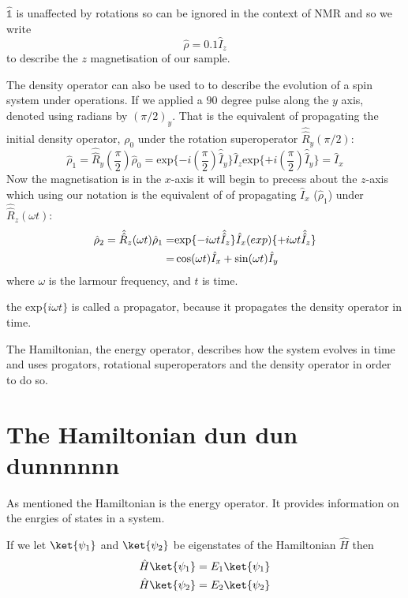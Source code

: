 $\hat{\mathbb{1}}$ is unaffected by rotations so can be ignored in the context of NMR
and so we write
\begin{equation}
  \hat{\rho} = 0.1\hat{I}_z
\end{equation}
to describe the $z$ magnetisation of our sample.

The density operator can also be used to to describe the evolution of a spin system under operations. If we applied a $90$ degree pulse along the $y$ axis, denoted using radians by $(\pi/2)_y$. That is the equivalent of propagating the initial density operator, $\rho_0$
under the rotation superoperator $\hat{\hat{R}}_y(\pi/2)$:
\begin{equation}
  \hat{\rho}_1 = \hat{\hat{R}}_y(\frac{\pi}{2})\hat\rho_0 = \text{exp}\{-i(\frac{\pi}{2})\hat{\hat{I}}_y\}\hat{I}_z\text{exp}\{+i(\frac{\pi}{2})\hat{\hat{I}}_y\} = \hat{I}_x
\end{equation}
Now the magnetisation is in the $x$-axis it will begin to precess about the $z$-axis which using our notation is the equivalent of of propagating $\hat{I}_x$ ($\hat{\rho}_1$)
under $\hat{\hat{R}}_z(\omega t)$:
\begin{equation}\label{eqn:propagate}
\begin{align}
  \hat{\rho}_2 = \hat{\hat{R}}_z(\omega t)\hat{\rho}_1 =& \text{exp}\{-i\omega t\hat{\hat{I}}_z\}\hat{I}_x\text(exp)\{+i\omega t\hat{\hat{I}}_z\}\\
   =& \cos(\omega t)\hat{I}_x + \sin(\omega t)\hat{I}_y
\end{align}
\end{equation}
where $\omega$ is the larmour frequency, and $t$ is time.

the $\text{exp}\{i\omega t\}$ is called a propagator, because it propagates the density operator in time.

The Hamiltonian, the energy operator, describes how the system evolves in time and uses progators, rotational superoperators and the density operator in order to do so.

\section{The Hamiltonian dun dun dunnnnnn}

As mentioned the Hamiltonian is the energy operator. It provides information on the enrgies of states in a system.

If we let $\ket{\psi_1}$ and $\ket{\psi_2}$ be eigenstates of the Hamiltonian $\hat{H}$ then
\begin{equation}
\begin{align}
  \hat{H}\ket{\psi_1} = E_1\ket{\psi_1}\\
  \hat{H}\ket{\psi_2} = E_2\ket{\psi_2}
\end{align}
\end{equation}

